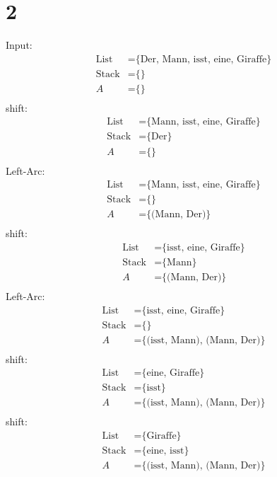 \documentclass[a4paper,11pt,fleqn]{scrartcl}
\begin{document}
\section*{2}
Input:
\begin{align}
	\text{List} &= \text{\{Der, Mann, isst, eine, Giraffe\}} \\ %
	\text{Stack} &= \text{\{\}} \\
	A &= \text{\{\}} \\	
\end{align}
shift:
\begin{align}
	\text{List} &= \text{\{Mann, isst, eine, Giraffe\}} \\ 
	\text{Stack} &= \text{\{Der\}} \\
	A &= \text{\{\}} \\	
\end{align}
Left-Arc:
\begin{align}
	\text{List} &= \text{\{Mann, isst, eine, Giraffe\}} \\ 
	\text{Stack} &= \text{\{\}} \\
	A &= \text{\{(Mann, Der)\}} \\	
\end{align}
shift:
\begin{align}
	\text{List} &= \text{\{isst, eine, Giraffe\}} \\ 
	\text{Stack} &= \text{\{Mann\}} \\
	A &= \text{\{(Mann, Der)\}} \\	
\end{align}
Left-Arc:
\begin{align}
	\text{List} &= \text{\{isst, eine, Giraffe\}} \\ 
	\text{Stack} &= \text{\{\}} \\
	A &= \text{\{(isst, Mann), (Mann, Der)\}} \\	
\end{align}
shift:
\begin{align}
	\text{List} &= \text{\{eine, Giraffe\}} \\ 
	\text{Stack} &= \text{\{isst\}} \\
	A &= \text{\{(isst, Mann), (Mann, Der)\}} \\	
\end{align}
shift:
\begin{align}
	\text{List} &= \text{\{Giraffe\}} \\ 
	\text{Stack} &= \text{\{eine, isst\}} \\
	A &= \text{\{(isst, Mann), (Mann, Der)\}} \\	
\end{align}
\end{document}
